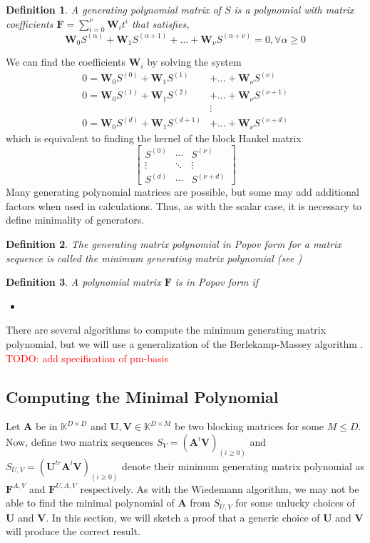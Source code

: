 \documentclass[12pt]{article}
\newtheorem{definition}{Definition}
\def\mA{\mathbf{A}}
\def\mF{\mathbf{F}}
\def\mU{\mathbf{U}}
\def\mV{\mathbf{V}}
\def\mW{\mathbf{W}}
\begin{document}
\begin{definition}
	A generating polynomial matrix of $S$ is 
	a polynomial with matrix coefficients
	$\mF = \sum^{\nu}_{i=0} \mW_i t^i $ that satisfies,
	$$ \mW_0 S^{(\alpha)} + \mW_1 S^{(\alpha+1)} + \dots + \mW_\nu S^{(\alpha+\nu)}  = 0, \forall \alpha \ge 0$$ 
\end{definition}
We can find the coefficients $\mW_i$ by solving the system
\begin{align*}
	0 = \mW_0 S^{(0)} + \mW_1 S^{(1)} &+ \dots + \mW_\nu S^{(\nu)}   \\
	0 = \mW_0 S^{(1)} + \mW_1 S^{(2)} &+ \dots + \mW_\nu S^{(\nu+1)} \\
	&\vdots \\
	0 = \mW_0 S^{(d)} + \mW_1 S^{(d+1)} &+ \dots + \mW_\nu S^{(\nu+d)}
\end{align*}
which is equivalent to finding the kernel of the block Hankel
matrix
$$ \begin{bmatrix}
S^{(0)} & \cdots & S^{(\nu)}\\
\vdots & \ddots & \vdots\\
S^{(d)} & \cdots & S^{(\nu + d)}
\end{bmatrix}$$
Many generating polynomial matrices are possible, but some
may add additional factors when used in calculations.
Thus, as with the scalar case, it is necessary to define
minimality of generators.

\begin{definition}
	The generating matrix polynomial in Popov form
	for a matrix sequence is called
	the minimum generating matrix polynomial (see
	\cite[definition 2.3]{KaVi04})
\end{definition}

\begin{definition}
	A polynomial matrix $\mF$ is in Popov form if
	\begin{itemize}
		\item 
	\end{itemize}
\end{definition}

There are several algorithms to compute the minimum generating
matrix polynomial, but we will use a generalization
of the Berlekamp-Massey algorithm \cite{Coppersmith93}.
\textcolor{red}{TODO: add specification of pm-basis}



\subsection{Computing the Minimal Polynomial}
Let $\mA$ be in $\mathbb{K}^{D \times D}$ and 
$\mU,\mV \in \mathbb{K}^{D \times M}$ be two blocking matrices
for some $M \le D$. Now, define two matrix sequences
$S_V = (\mA^i \mV)_{(i \ge 0)}$ and 
$S_{U,V} = (\mU^{tr} \mA^i \mV)_{(i \ge 0)}$ denote their minimum
generating matrix polynomial as $\mF^{A,V}$ and $\mF^{U,A,V}$
respectively. As with the Wiedemann algorithm, we may not
be able to find the minimal polynomial of $\mA$ from 
$S_{U,V}$ for some unlucky choices of $\mU$ and $\mV$. In this
section, we will sketch a proof that a generic choice of
$\mU$ and $\mV$ will produce the correct result.
\end{document}
